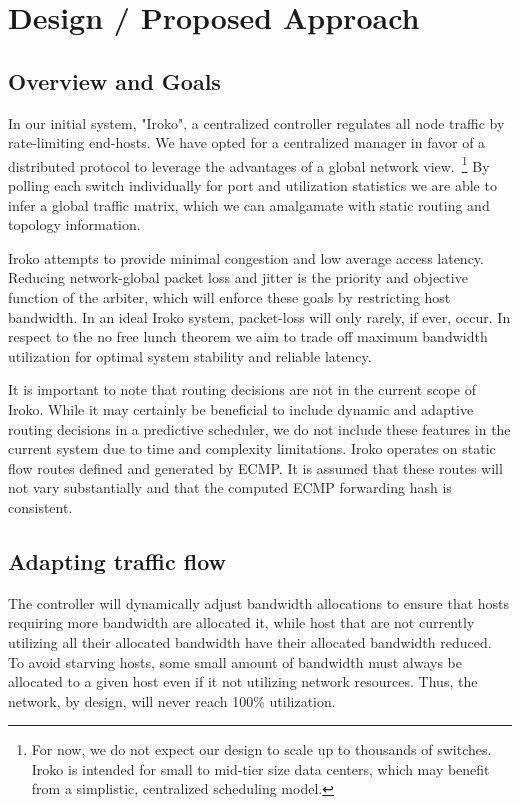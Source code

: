 

\section{Design / Proposed Approach}
\label{sec:design}

\subsection{Overview and Goals}
In our initial system, "Iroko", a centralized controller regulates all 
node traffic by rate-limiting end-hosts. We have opted for a centralized 
manager in favor of a distributed protocol to leverage the advantages of a 
global network view.~\footnote{For now, we do not expect our design to scale up 
to thousands of switches. Iroko is intended for small to mid-tier size data 
centers, which may benefit from a simplistic, centralized scheduling model.}
By polling each switch individually for port and utilization statistics we are 
able to infer a global traffic matrix, which we can amalgamate with static 
routing and topology information. 

Iroko attempts to provide minimal congestion and low average access latency. Reducing 
network-global packet loss and jitter is the priority and objective function of 
the arbiter, which will enforce these goals by restricting host bandwidth. In 
an ideal Iroko system, packet-loss will only rarely, if ever, occur. In respect 
to the no free lunch theorem we aim to trade off maximum bandwidth utilization for 
optimal system stability and reliable latency.

It is important to note that routing decisions are not in the current scope of 
Iroko. While it may certainly be beneficial to include dynamic and adaptive 
routing decisions in a predictive scheduler, we do not include these features 
in the current system due to time and complexity limitations. Iroko operates on 
static flow routes defined and generated by ECMP. It is assumed that these 
routes will not vary substantially and that the computed ECMP forwarding hash 
is consistent.

\subsection{Adapting traffic flow}

The controller will dynamically adjust bandwidth allocations to ensure that hosts 
requiring more bandwidth are allocated it, while host that are not currently 
utilizing all their allocated bandwidth have their allocated bandwidth reduced. 
To avoid starving hosts, some small amount of bandwidth must always be 
allocated to a given host even if it not utilizing network resources. Thus, the 
network, by design, will never reach 100\% utilization.

